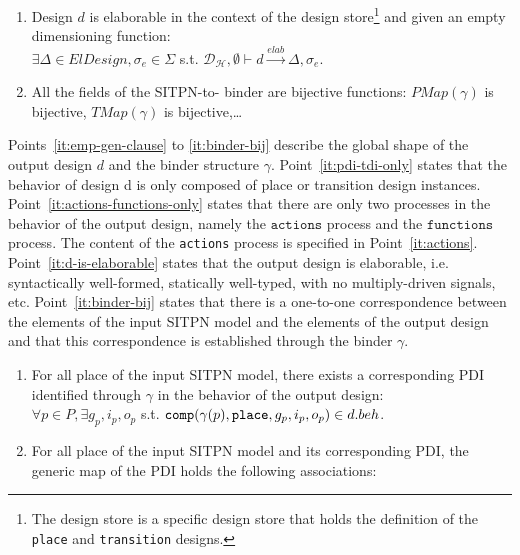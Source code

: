 \begin{definition}
\begin{enumerate}
  \item\label{it:d-is-elaborable} Design $d$ is elaborable in the context of the \hilecop{} design store\footnote{The \hilecop{} design store is a specific design store that holds the definition of the \texttt{place} and \texttt{transition} designs.} and given an empty dimensioning function:\\
    $\exists{}\Delta\in{}ElDesign,\sigma_e\in\Sigma$ s.t.
    $\mathcal{D_\mathcal{H}},\emptyset\vdash{}d\xrightarrow{elab}\Delta,\sigma_e$.
    
  \item\label{it:binder-bij} All the fields of the SITPN-to-\hvhdl{} binder are bijective
    functions: $PMap(\gamma)$ is bijective, $TMap(\gamma)$ is
    bijective,\dots
  \end{enumerate}

  \bigskip
  
  Points~\ref{it:emp-gen-clause} to \ref{it:binder-bij} describe the
  global shape of the output design $d$ and the binder structure
  $\gamma$.  Point~\ref{it:pdi-tdi-only} states that the behavior of
  design d is only composed of place or transition design
  instances. Point~\ref{it:actions-functions-only} states that there
  are only two processes in the behavior of the output design, namely
  the $\mathtt{actions}$ process and the $\mathtt{functions}$
  process. The content of the \texttt{actions} process is specified in
  Point~\ref{it:actions}. Point~\ref{it:d-is-elaborable} states that
  the output design is elaborable, i.e. syntactically well-formed,
  statically well-typed, with no multiply-driven signals, etc.
  Point~\ref{it:binder-bij} states that there is a one-to-one
  correspondence between the elements of the input SITPN model and the
  elements of the output design and that this correspondence is
  established through the binder $\gamma$.

  \bigskip
  
  \begin{enumerate}[resume]
  \item\label{it:pdi-exists} For all place of the input SITPN model,
    there exists a corresponding PDI identified through $\gamma$ in
    the behavior of the output
    design:\\
    $\forall{}p\in{}P,\exists{}g_p,i_p,o_p$ s.t.  $\mathtt{comp}(\gamma(p),\mathtt{place},g_p,i_p,o_p)\in{}d.beh$.
    
  \item\label{it:pdi-gmap} For all place of the input SITPN model and
    its corresponding PDI, the generic map of the PDI holds the
    following associations:
    

\end{enumerate}
\end{definition}
